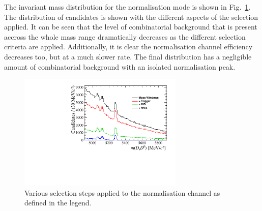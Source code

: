 The \Bp invariant mass distribution for the normalisation mode is shown in Fig.~\ref{fig:norm_selection}. The distribution of candidates is shown with the different aspects of the selection applied. It can be seen that the level of combinatorial background that is present accross the whole mass range dramatically decreases as the different selection criteria are applied. Additionally, it is clear the normalisation channel efficiency decreases too, but at a much slower rate. The final distribution has a negligible amount of combinatorial background with an isolated normalisation peak.


\begin{figure}[!h]
    \centering
        \includegraphics[width=0.7\textwidth]{figs/Selection/Normalisation_with_sel_B2DsD0.pdf}
    \caption{Various selection steps applied to the normalisation channel as defined in the legend.}
    \label{fig:norm_selection}   
\end{figure}


